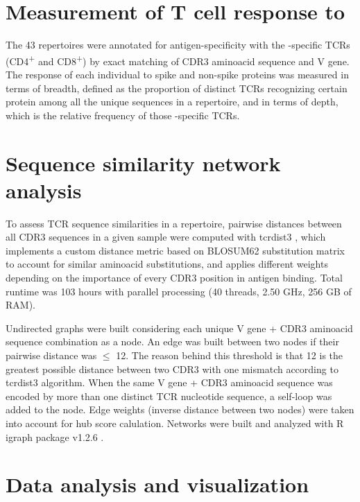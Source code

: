 \section*{Measurement of T cell response to \covid}


The 43 \TCRB{} repertoires were annotated for antigen-specificity with the \covid-specific TCRs (CD4\textsuperscript{+} and CD8\textsuperscript{+}) by exact matching of CDR3 aminoacid sequence and V gene. The \covid{} response of each individual to spike and non-spike proteins was measured in terms of breadth, defined as the proportion of distinct TCRs recognizing certain protein among all the unique sequences in a repertoire, and in terms of depth, which is the relative frequency of those \covid-specific TCRs.



\section*{Sequence similarity network analysis}


To assess TCR sequence similarities in a repertoire, pairwise distances between all CDR3 sequences in a given sample were computed with tcrdist3 \citep{metaclonotypes, tcrdist}, which implements a custom distance metric based on BLOSUM62 substitution matrix to account for similar aminoacid substitutions, and applies different weights depending on the importance of every CDR3 position in antigen binding. Total runtime was 103 hours with parallel processing (40 threads, 2.50 GHz, 256 GB of RAM).

Undirected graphs were built considering each unique V gene + CDR3 aminoacid sequence combination as a node. An edge was built between two nodes if their pairwise distance was $\leq$ 12. The reason behind this threshold is that 12 is the greatest possible distance between two CDR3 with one mismatch according to tcrdist3 algorithm. When the same V gene + CDR3 aminoacid sequence was encoded by more than one distinct TCR nucleotide sequence, a self-loop was added to the node. Edge weights (inverse distance between two nodes) were taken into account for hub score calulation. Networks were built and analyzed with R igraph package v1.2.6 \citep{igraph}.

\section*{Data analysis and visualization}



